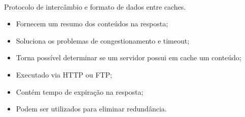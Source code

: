 \paragraph{} Protocolo de interc\^ambio e formato de dados entre caches.
\begin{itemize}
\item Fornecem um resumo dos conte\'udos na resposta;
\item Soluciona os problemas de congestionamento e timeout;
\item Torna poss\'ivel determinar se um servidor possui em cache um conte\'udo;
\item Executado via HTTP ou FTP;
\item Cont\'em tempo de expira\c{c}\~ao na resposta;
\item Podem ser utilizados para eliminar redund\^ancia.
\end{itemize}

